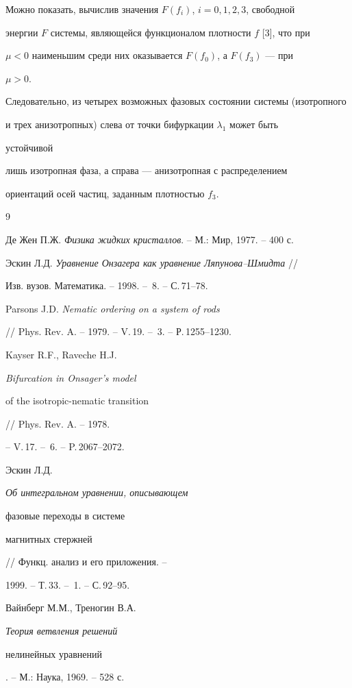 Можно показать, вычислив значения $F(f_i)$, $i=0,1,2,3$, свободной 


энергии $F$ системы, являющейся функционалом плотности $f$ [3], что при


$\mu<0$ наименьшим среди них оказывается $F(f_0)$, а $F(f_3)$ --- при 


$\mu>0$.


Следовательно, из четырех возможных фазовых состоянии системы (изотропного 


и трех анизотропных) слева от точки бифуркации $\lambda_1$ может быть 


устойчивой 


лишь изотропная фаза, а справа --- анизотропная с распределением 


ориентаций осей частиц, заданным плотностью $f_3$.








\begin{thebibliography}{9}







Де Жен П.Ж. {\em Физика жидких кристаллов}. -- М.: Мир, 1977. -- 400 с.




Эскин Л.Д. {\em Уравнение Онзагера как уравнение Ляпунова--Шмидта} //


Изв. вузов. Математика. -- 1998. -- \No\,8. -- С.\,71--78.




Parsons J.D. {\em Nematic ordering on a system of rods}


// Phys. Rev. A. -- 1979. -- V.\,19. -- \No\,3. -- Р.\,1255--1230.




Kayser R.F., Raveche H.J. {\em Bifurcation in Onsager's model


of the isotropic-nematic transition} // Phys. Rev. A. -- 1978.


-- V.\,17. -- \No\,6. -- P.\,2067--2072.




Эскин Л.Д. {\em Об интегральном уравнении, описывающем 


фазовые переходы в системе 


магнитных стержней} // Функц. анализ и его приложения. --


1999. -- Т.\,33. -- \No\,1. -- С.\,92--95.




Вайнберг М.М., Треногин В.А. {\em Теория ветвления решений 


нелинейных уравнений}. -- М.: Наука, 1969. -- 528 с.





\end{thebibliography}





\vskip 0.5cm












\label{end}





